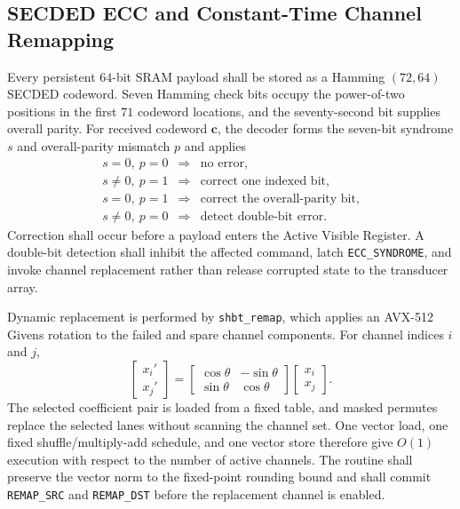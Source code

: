 \documentclass[10pt,twocolumn]{IEEEtran}
\begin{document}
\subsection{SECDED ECC and Constant-Time Channel Remapping}

Every persistent $64$-bit SRAM payload shall be stored as a Hamming $(72,64)$ SECDED codeword.  Seven Hamming check bits occupy the power-of-two positions in the first $71$ codeword locations, and the seventy-second bit supplies overall parity.  For received codeword $\bm c$, the decoder forms the seven-bit syndrome $s$ and overall-parity mismatch $p$ and applies
\begin{equation}
\begin{array}{ccl}
s=0,\ p=0 &\Rightarrow& \text{no error},\\
s\neq0,\ p=1 &\Rightarrow& \text{correct one indexed bit},\\
s=0,\ p=1 &\Rightarrow& \text{correct the overall-parity bit},\\
s\neq0,\ p=0 &\Rightarrow& \text{detect double-bit error}.
\end{array}
\label{eq:secded_decision_table}
\end{equation}
Correction shall occur before a payload enters the Active Visible Register.  A double-bit detection shall inhibit the affected command, latch \texttt{ECC\_SYNDROME}, and invoke channel replacement rather than release corrupted state to the transducer array.

Dynamic replacement is performed by \texttt{shbt\_remap}, which applies an AVX-512 Givens rotation to the failed and spare channel components.  For channel indices $i$ and $j$,
\begin{equation}
\begin{bmatrix}x_i'\\x_j'\end{bmatrix}
=
\begin{bmatrix}\cos\theta&-\sin\theta\\
\sin\theta&\cos\theta\end{bmatrix}
\begin{bmatrix}x_i\\x_j\end{bmatrix}.
\label{eq:givens_channel_remap}
\end{equation}
The selected coefficient pair is loaded from a fixed table, and masked permutes replace the selected lanes without scanning the channel set.  One vector load, one fixed shuffle/multiply-add schedule, and one vector store therefore give $O(1)$ execution with respect to the number of active channels.  The routine shall preserve the vector norm to the fixed-point rounding bound and shall commit \texttt{REMAP\_SRC} and \texttt{REMAP\_DST} before the replacement channel is enabled.
\end{document}
